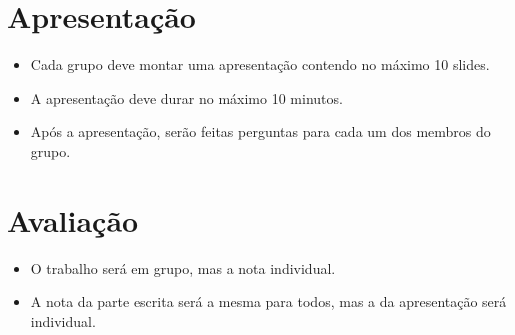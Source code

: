 \documentclass{article}
\begin{document}
\section{Apresentação}
\begin{itemize}
    \item Cada grupo deve montar uma apresentação contendo no máximo 10 slides. 
    \item A apresentação deve durar no máximo 10 minutos. 
    \item Após a apresentação, serão feitas perguntas para cada um dos membros do grupo. 
\end{itemize}

\section{Avaliação}

\begin{itemize}
    \item O trabalho será em grupo, mas a nota individual. 
    \item A nota da parte escrita será a mesma para todos, mas a da apresentação será individual. 
\end{itemize}
\end{document}
